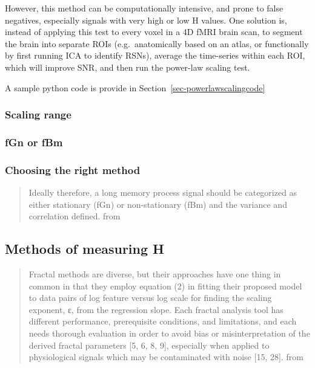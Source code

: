 \documentclass[
  sn-vancouver,
  Numbered,
  referee,
  lineno]{sn-jnl}
\begin{document}
However, this method can be computationally intensive, and prone to
false negatives, especially signals with very high or low H values. One
solution is, instead of applying this test to every voxel in a 4D fMRI
brain scan, to segment the brain into separate ROIs (e.g.~anatomically
based on an atlas, or functionally by first running ICA to identify
RSNs), average the time-series within each ROI, which will improve SNR,
and then run the power-law scaling test.

A sample python code is provide in Section~\ref{sec-powerlawscalingcode}

\subsubsection{Scaling range}\label{scaling-range-1}

\subsubsection{fGn or fBm}\label{fgn-or-fbm}

\subsubsection{Choosing the right
method}\label{choosing-the-right-method}

\begin{quote}
Ideally therefore, a long memory process signal should be categorized as
either stationary (fGn) or non-stationary (fBm) and the variance and
correlation defined. from \citep{ekePhysiologicalTimeSeries2000}
\end{quote}

\subsection{Methods of measuring H}\label{methods-of-measuring-h}

\begin{quote}
Fractal methods are diverse, but their approaches have one thing in
common in that they employ equation (2) in fitting their proposed model
to data pairs of log feature versus log scale for finding the scaling
exponent, ε, from the regression slope. Each fractal analysis tool has
different performance, prerequisite conditions, and limitations, and
each needs thorough evaluation in order to avoid bias or
misinterpretation of the derived fractal parameters {[}5, 6, 8, 9{]},
especially when applied to physiological signals which may be
contaminated with noise {[}15, 28{]}. from
\citep{ekePhysiologicalTimeSeries2000}
\end{quote}
\end{document}
